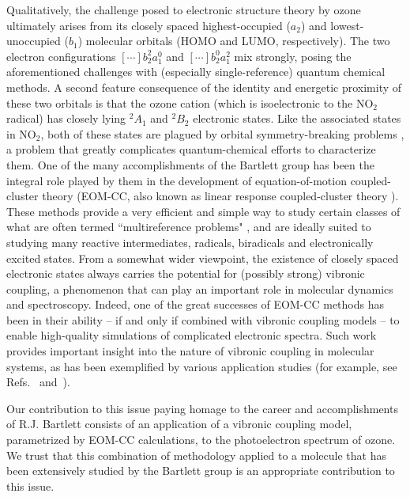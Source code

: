 \documentclass[
12pt,
a4paper,
prb,
superscriptaddress,
tightenlines,  %
]{revtex4}
\begin{document}
Qualitatively, the challenge posed to electronic structure theory by ozone
ultimately arises from its closely spaced highest-occupied ($a_2$) and
lowest-unoccupied ($b_1$) molecular orbitals (HOMO and LUMO, respectively).
The two electron configurations $[\cdots]b_2^2 a_1^0$ and $[\cdots]b_2^0
a_1^2$ mix strongly, posing the aforementioned challenges with (especially
single-reference) quantum chemical methods.   A second feature consequence of
the identity and energetic proximity of these two orbitals is that the ozone
cation (which is isoelectronic to the NO$_2$ radical) has closely lying
$^2A_1$ and $^2B_2$ electronic states.   Like the associated states in NO$_2$,
both of these states are plagued by orbital symmetry-breaking problems
\cite{Davidson:SymmBreak:76}, a problem that greatly complicates
quantum-chemical efforts to characterize them.   One of the many
accomplishments of the Bartlett group has been the integral role played by
them in the development of equation-of-motion coupled-cluster theory
\cite{Stanton:93:EOMCC, Nooijen:EOMEA:95, Bartlett:CC_review:07} (EOM-CC, also
known as linear response coupled-cluster theory \cite{Koch:90:LinResp}). These
methods provide a very efficient and simple way to study certain classes of
what are often termed ``multireference problems" \cite{Krylov:EOMRev:07}, and
are ideally suited to studying many reactive intermediates, radicals,
biradicals and electronically excited states.   From a somewhat wider
viewpoint, the existence of closely spaced electronic states always carries
the potential for (possibly strong) vibronic coupling, a phenomenon that can
play an important role in molecular dynamics and spectroscopy.  Indeed, one of
the great successes of EOM-CC methods has been in their ability -- if and only
if combined with vibronic coupling models -- to enable high-quality
simulations of complicated electronic spectra.   Such work provides important
insight into the nature of vibronic coupling in molecular systems, as has been
exemplified by various application studies (for example, see
Refs.~\cite{Stanton:NO3:07} and~\cite{Koppel:02}).

Our contribution to this issue paying homage to the career and accomplishments
of R.J. Bartlett consists of an application of a vibronic coupling model,
parametrized by EOM-CC calculations, to the photoelectron spectrum of ozone.
We trust that this combination of methodology applied to a molecule that has
been extensively studied by the Bartlett group is an appropriate contribution
to this issue.
\end{document}
